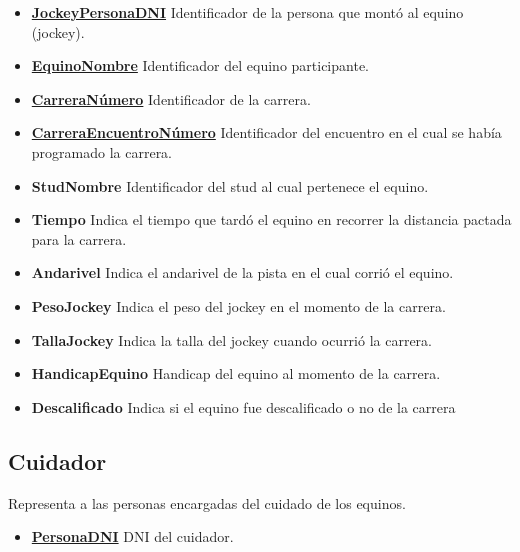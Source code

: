 \documentclass[a4paper,11pt]{article}
\begin{document}
\begin{itemize}

  \item \textbf{\uline{JockeyPersonaDNI}} Identificador de la persona que montó
	al equino (jockey).
  
  \item \textbf{\uline{EquinoNombre}} Identificador del equino participante.
  
  \item \textbf{\uline{CarreraNúmero}} Identificador de la carrera.
  
  \item \textbf{\uline{CarreraEncuentroNúmero}} Identificador del encuentro
	en el cual se había programado la carrera.
  
  \item \textbf{StudNombre} Identificador del stud al cual pertenece el equino.
  
  \item \textbf{Tiempo} Indica el tiempo que tardó el equino en recorrer la distancia
	pactada para la carrera.
  
  \item \textbf{Andarivel} Indica el andarivel de la pista en el cual
	corrió el equino.
  
  \item \textbf{PesoJockey} Indica el peso del jockey en el momento de la carrera.
  
  \item \textbf{TallaJockey} Indica la talla del jockey cuando ocurrió la carrera.
  
  \item \textbf{HandicapEquino} Handicap del equino al momento de la carrera.
  
  \item \textbf{Descalificado} Indica si el equino fue descalificado o no
	de la carrera
  
\end{itemize}


\subsection{Cuidador}

Representa a las personas encargadas del cuidado de los equinos.

\begin{itemize}

	\item \textbf{\uline{PersonaDNI}} DNI del cuidador.
	
\end{itemize}
\end{document}
